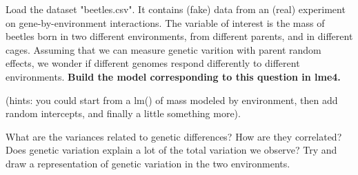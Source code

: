 \documentclass[12pt,a4paper]{scrartcl}\usepackage[]{graphicx}\usepackage[]{color}
\makeatletter
\newcommand{\hlnum}[1]{\textcolor[rgb]{0.686,0.059,0.569}{#1}}%
\newcommand{\hlopt}[1]{\textcolor[rgb]{0,0,0}{#1}}%
\newcommand{\hlstd}[1]{\textcolor[rgb]{0.345,0.345,0.345}{#1}}%
\newcommand{\hlkwb}[1]{\textcolor[rgb]{0.69,0.353,0.396}{#1}}%
\newcommand{\hlkwc}[1]{\textcolor[rgb]{0.333,0.667,0.333}{#1}}%
\newcommand{\hlkwd}[1]{\textcolor[rgb]{0.737,0.353,0.396}{\textbf{#1}}}%
\newenvironment{kframe}{%
 \def\at@end@of@kframe{}%
 \ifinner\ifhmode%
  \def\at@end@of@kframe{\end{minipage}}%
  \begin{minipage}{\columnwidth}%
 \fi\fi%
 \def\FrameCommand##1{\hskip\@totalleftmargin \hskip-\fboxsep
 \colorbox{shadecolor}{##1}\hskip-\fboxsep
     \hskip-\linewidth \hskip-\@totalleftmargin \hskip\columnwidth}%
 \MakeFramed {\advance\hsize-\width
   \@totalleftmargin\z@ \linewidth\hsize
   \@setminipage}}%
 {\par\unskip\endMakeFramed%
 \at@end@of@kframe}
\newenvironment{knitrout}{}{} %
\makeatother
\begin{document}






\begin{Exercise}[difficulty=2, title={Beetles: build a model}]
Load the dataset "beetles.csv". It contains (fake) data from an (real) experiment on gene-by-environment interactions. The variable of interest is the mass of beetles born in two different environments, from different parents, and in different cages. Assuming that we can measure genetic varition with parent random effects, we wonder if different genomes respond differently to different environments.
\textbf{Build the model corresponding to this question in lme4.}

(hints: you could start from a lm() of mass modeled by environment, then add random intercepts, and finally a little something more).
\end{Exercise}

\begin{Exercise}[difficulty=2, title={Beetles: look at the model}]
What are the variances related to genetic differences? How are they correlated? Does genetic variation explain a lot of the total variation we observe? Try and draw a representation of genetic variation in the two environments. 
\end{Exercise}
\end{document}
